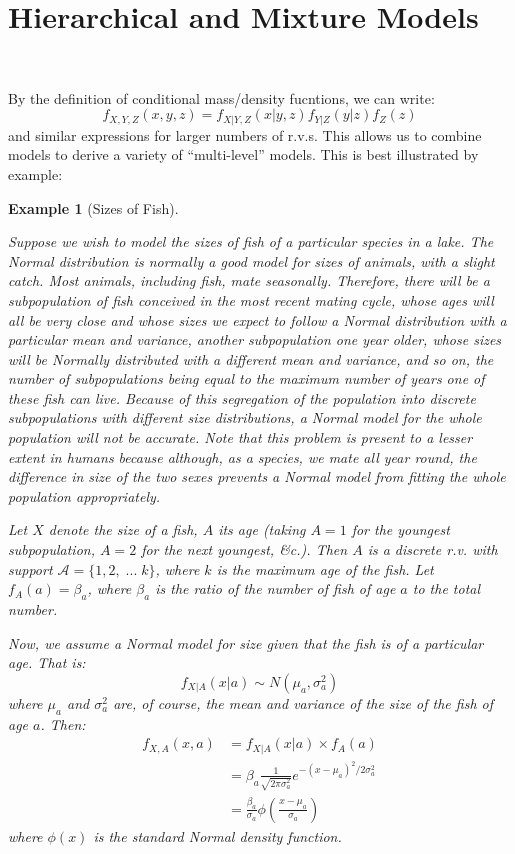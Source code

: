 \documentclass[12pt,a4paper]{article}
\newtheorem{ex}[thm]{Example}
\begin{document}
\clearpage
\section{Hierarchical and Mixture Models}$\;$

By the definition of conditional mass/density fucntions, we can write:
$$f_{X,Y,Z}(x,y,z) = f_{X|Y,Z}(x|y,z) f_{Y|Z}(y|z) f_Z(z)$$
and similar expressions for larger numbers of r.v.s. This allows us to combine models to derive a variety of ``multi-level'' models. This is best illustrated by example:

\begin{ex}[Sizes of Fish]$\quad$\par\vspace{1cm}

Suppose we wish to model the sizes of fish of a particular species in a lake. The Normal distribution is normally a good model for sizes of animals, with a slight catch. Most animals, including fish, mate seasonally. Therefore, there will be a subpopulation of fish conceived in the most recent mating cycle, whose ages will all be very close and whose sizes we expect to follow a Normal distribution with a particular mean and variance, another subpopulation one year older, whose sizes will be Normally distributed \emph{with a different mean and variance}, and so on, the number of subpopulations being equal to the maximum number of years one of these fish can live. Because of this segregation of the population into discrete subpopulations with different size distributions, a Normal model for the whole population will not be accurate. Note that this problem is present to a lesser extent in humans because although, as a species, we mate all year round, the difference in size of the two sexes prevents a Normal model from fitting the whole population appropriately.

Let $X$ denote the size of a fish, $A$ its age (taking $A=1$ for the youngest subpopulation, $A=2$ for the next youngest, \&c.). Then $A$ is a discrete r.v. with support $\mathcal{A} = \{1,2,\; ...\; k\}$, where $k$ is the maximum age of the fish. Let $f_A(a) = \beta_a$, where $\beta_a$ is the ratio of the number of fish of age $a$ to the total number.

Now, we assume a Normal model for size \emph{given that the fish is of a particular age}. That is:
$$f_{X|A}(x|a) \sim N(\mu_a,\sigma_a^2)$$
where $\mu_a$ and $\sigma_a^2$ are, of course, the mean and variance of the size of the fish of age $a$. Then:
\begin{align*}
f_{X,A}(x,a) &= f_{X|A}(x|a) \times f_A(a)\\
&= \beta_a \frac{1}{\sqrt{2 \pi \sigma^2_a}} e^{-(x-\mu_a)^2/2\sigma^2_a}\\
&= \frac{\beta_a}{\sigma_{a}} \phi\left(\frac{x-\mu_a}{\sigma_a}\right)
\end{align*}
where $\phi(x)$ is the standard Normal density function.


\end{ex}
\end{document}
